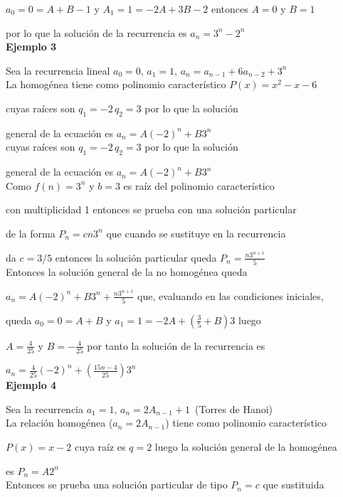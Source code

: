 \documentclass[a4paper,12pt]{report}
\begin{document}
$a_0=0=A+B-1$ y $A_1=1=-2A+3B-2$ entonces $A=0$ y $B=1$

por lo que la solución de la recurrencia es $a_n=3^n-2^n$\\

\textbf{Ejemplo 3}

Sea la recurrencia lineal $a_0=0,\, a_1=1,\, a_n=a_{n-1}+6a_{n-2}+3^n$\\

La homogénea tiene como polinomio característico $P(x)=x^2-x-6$ 

cuyas raíces son $q_1=-2\, q_2=3$ por lo que la solución 

general de la ecuación es  $a_n=A(-2)^n+B3^n$\\

cuyas raíces son $q_1=-2\, q_2=3$ por lo que la solución 

general de la ecuación es  $a_n=A(-2)^n+B3^n$\\

Como $f(n)=3^n$ y  $b=3$ es raíz del polinomio característico  

con  multiplicidad 1 entonces se prueba con una solución particular 

de la forma $P_n=cn3^n$ que cuando se sustituye en la recurrencia 

da $c=3/5$ entonces la solución particular queda $P_n=\frac{n3^{n+1}}{5}$\\

Entonces la solución general de la no homogénea queda 

$a_n=A(-2)^n+B3^n+\frac{n3^{n+1}}{5}$ que, evaluando en las condiciones iniciales,

queda $a_0=0=A+B$ y $a_1=1=-2A+(\frac{3}{5}+B)3$ luego 

$A=\frac{4}{25}$ y $B=-\frac{4}{25}$ por tanto la solución de la recurrencia es

$a_n=\frac{4}{25}(-2)^n+(\frac{15n-4}{25})3^n$\\

\textbf{Ejemplo 4}

Sea la recurrencia $a_1=1,\, a_n=2A_{n-1}+1$~(Torres de Hanoi)\\

La relación homogénea ($a_n=2A_{n-1}$) tiene como polinomio característico

$P(x)=x-2$ cuya raíz es $q=2$ luego la solución general de la homogénea 

es  $P_n=A2^n$\\

Entonces se prueba una solución particular de tipo $P_n=c$ que sustituida 
\end{document}
